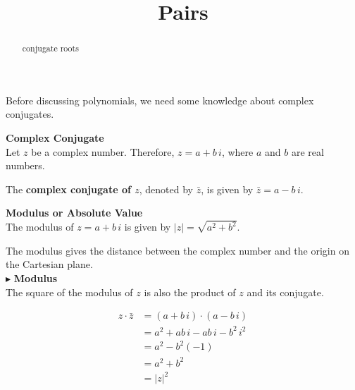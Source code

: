 \documentclass{ximera}
\title{Pairs}
\begin{document}
\begin{abstract}
conjugate roots
\end{abstract}
\maketitle







Before discussing polynomials, we need some knowledge about complex conjugates.




\begin{definition} \textbf{\textcolor{green!50!black}{Complex Conjugate}} \\

Let $z$ be a complex number.  Therefore, $z = a + b \, i$, where $a$ and $b$ are real numbers.



The \textbf{complex conjugate of $z$}, denoted by $\bar{z}$, is given by $\bar{z} = a - b \, i$.



\end{definition}












\begin{definition}   \textbf{\textcolor{green!50!black}{Modulus or Absolute Value}} \\

The modulus of $z = a + b \, i$ is given by $|z| = \sqrt{a^2 + b^2}$. 


\end{definition}

The modulus gives the distance between the complex number and the origin on the Cartesian plane. \\



$\blacktriangleright$ \textbf{Modulus}  \\

The square of the modulus of $z$ is also the product of $z$ and its conjugate.


\begin{explanation}

\begin{align*}
z \cdot \bar{z} &= (a + b \, i) \cdot (a - b \, i) \\
                &= a^2 + ab \, i - ab \, i - b^2 \, i^2 \\
                &= a^2 - b^2 (-1) \\
                &= a^2 + b^2  \\
                &= |z|^2  
\end{align*}


\end{explanation}
\end{document}

